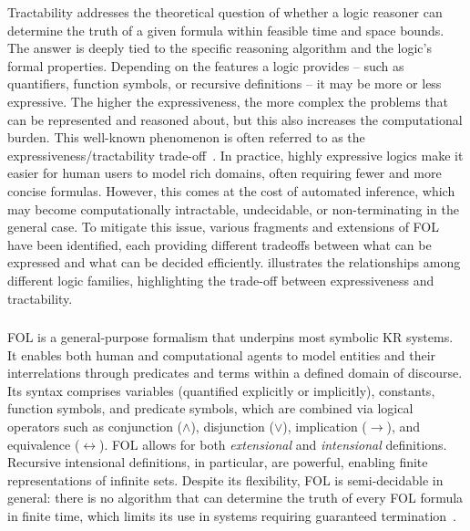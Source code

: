%
Tractability addresses the theoretical question of whether a logic reasoner can determine the truth of a given formula within feasible time and space bounds.
%
The answer is deeply tied to the specific reasoning algorithm and the logic's formal properties.
%
Depending on the features a logic provides -- such as quantifiers, function symbols, or recursive definitions -- it may be more or less expressive.
%
The higher the expressiveness, the more complex the problems that can be represented and reasoned about, but this also increases the computational burden.
%
This well-known phenomenon is often referred to as the expressiveness/tractability trade-off~\cite{DBLP:journals/jlp/CadoliS93,BRACHMAN2004327,DBLP:journals/ci/LevesqueB87}.
%
In practice, highly expressive logics make it easier for human users to model rich domains, often requiring fewer and more concise formulas.
%
However, this comes at the cost of automated inference, which may become computationally intractable, undecidable, or non-terminating in the general case.
%
To mitigate this issue, various fragments and extensions of \gls{FOL} have been identified, each providing different tradeoffs between what can be expressed and what can be decided efficiently.
%
 illustrates the relationships among different logic families, highlighting the trade-off between expressiveness and tractability.


\subsubsection[First-order logic]{}\label{subsubsec:first-order-logic}
%
\Gls{FOL} is a general-purpose formalism that underpins most symbolic \gls{KR} systems.
%
It enables both human and computational agents to model entities and their interrelations through predicates and terms within a defined domain of discourse.
%
Its syntax comprises variables (quantified explicitly or implicitly), constants, function symbols, and predicate symbols, which are combined via logical operators such as conjunction (\(\wedge\)), disjunction (\(\vee\)), implication (\(\rightarrow\)), and equivalence (\(\leftrightarrow\)).
%
\Gls{FOL} allows for both \emph{extensional} and \emph{intensional} definitions.
%
Recursive intensional definitions, in particular, are powerful, enabling finite representations of infinite sets.
%
Despite its flexibility, \gls{FOL} is semi-decidable in general: there is no algorithm that can determine the truth of every \gls{FOL} formula in finite time, which limits its use in systems requiring guaranteed termination~\cite{DBLP:conf/dlog/2003handbook}.



